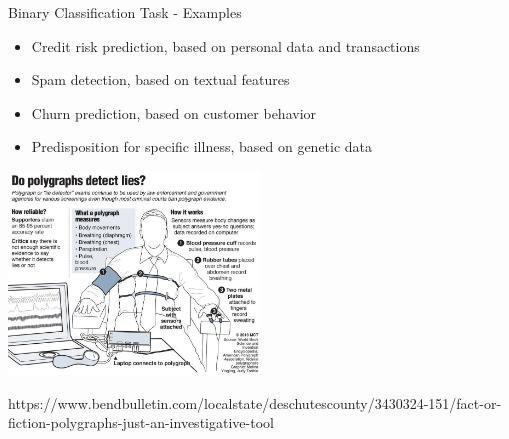 \documentclass[11pt,compress,t,notes=noshow, xcolor=table]{beamer}
\begin{document}
\begin{vbframe}{Binary Classification Task - Examples}

  \begin{itemize}
  \item Credit risk prediction, based on personal data and transactions 
  \item Spam detection, based on textual features 
  \item Churn prediction, based on customer behavior
  \item Predisposition for specific illness, based on genetic data
\end{itemize}

\begin{center}
  \includegraphics[width=0.5\textwidth]{figure_man/lie-detector-polygraph.jpg}
\end{center}
\vspace{-0.6cm}
\begin{flushright}
  \tiny https://www.bendbulletin.com/localstate/deschutescounty/3430324-151/fact-or-fiction-polygraphs-just-an-investigative-tool
\end{flushright}
\end{vbframe}
\end{document}
